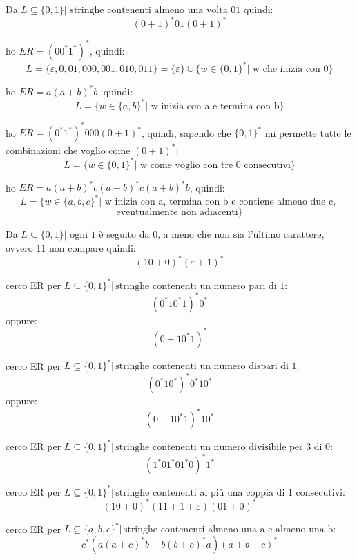 \begin{example}
	Da $L\subseteq\{0,1\}|\mbox{ stringhe contenenti almeno una volta 01}$
	quindi:
	$$(0+1)^*01(0+1)^*$$
\end{example}
\begin{example}
	ho $ER=(00^*1^*)^*$, quindi:
	$$L=\{\varepsilon,0,01,000,001,010,011\}=\{\varepsilon\}\cup\{w\in\{0,1\}^* |\mbox{ w che inizia con 0}\}$$
\end{example}
\begin{example}
	ho $ER=a(a+b)^*b$, quindi:
	$$L=\{w\in\{a,b\}^*|\mbox{ w inizia con a e termina con b}\}$$
\end{example}
\begin{example}
	ho $ER=(0^*1^*)^*000(0+1)^*$, quindi, sapendo che $\{0,1\}^*$ mi permette tutte le combinazioni che voglio come $(0+1)^*$:
	$$L=\{w\in\{0,1\}^*|\mbox{ w come voglio con tre 0 consecutivi}\}$$
\end{example}
\begin{example}
	ho $ER=a(a+b)^*c(a+b)^*c(a+b)^*b$, quindi:
	$$L=\{w\in\{a,b,c\}^*|\mbox{ w inizia con a, termina con b  e contiene almeno due c, }$$
	$$\mbox{eventualmente non adiacenti}\}$$
\end{example}
\begin{example}
	Da $L\subseteq\{0,1\}|\mbox{ ogni 1 è seguito da 0, a meno che non sia l'ultimo carattere}$, ovvero 11 non compare
	quindi:
	$$(10+0)^*(\varepsilon+1)^*$$
\end{example}
\begin{example}
	cerco ER per $L\subseteq\{0,1\}^*|\, \mbox{stringhe contenenti un numero pari di 1}$:
	$$(0^*10^*1)^*0^*$$
	oppure:
	$$(0+10^*1)^*$$
\end{example}
\begin{example}
	cerco ER per $L\subseteq\{0,1\}^*|\, \mbox{stringhe contenenti un numero dispari di 1}$:
	$$(0^*10^*)^*0^*10^*$$
	oppure:
	$$(0+10^*1)^*10^*$$
\end{example}
\begin{example}
	cerco ER per $L\subseteq\{0,1\}^*|\, \mbox{stringhe contenenti un numero divisibile per 3 di 0}$:
	$$(1^*01^*01^*0)^*1^*$$
\end{example}
\begin{example}
	cerco ER per $L\subseteq\{0,1\}^*|\, \mbox{stringhe contenenti al più una coppia di 1 consecutivi}$:
	$$(10+0)^*(11+1+\varepsilon)(01+0)^*$$
\end{example}
\begin{example}
	cerco ER per $L\subseteq\{a,b,c\}^*|\, \mbox{stringhe contenenti almeno una a e almeno una b}:$
	$$c^*\left(a(a+c)^*b+b(b+c)^*a\right)(a+b+c)^*$$
\end{example}

